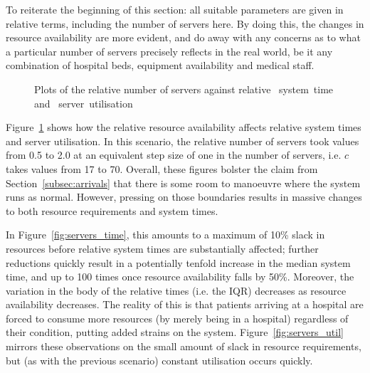 \documentclass[]{interact}
\newlength{\imgwidth}
\theoremstyle{plain}%
\theoremstyle{definition}
\theoremstyle{remark}
\begin{document}
To reiterate the beginning of this section: all suitable parameters are given in
relative terms, including the number of servers here. By doing this, the changes
in resource availability are more evident, and do away with any concerns as to
what a particular number of servers precisely reflects in the real world, be it
any combination of hospital beds, equipment availability and medical staff.

\begin{figure}
    \centering

    \caption{%
        Plots of the relative number of servers against relative
        ~system~time and
        ~server~utilisation
    }\label{fig:servers}
\end{figure}

Figure~\ref{fig:servers} shows how the relative resource availability affects
relative system times and server utilisation. In this scenario, the relative
number of servers took values from 0.5 to 2.0 at an equivalent step size of one
in the number of servers, i.e. \(c\) takes values from 17 to 70. Overall, these
figures bolster the claim from Section~\ref{subsec:arrivals} that there is some
room to manoeuvre where the system runs as normal. However, pressing on those
boundaries results in massive changes to both resource requirements and system
times.

In Figure~\ref{fig:servers_time}, this amounts to a maximum of 10\% slack in
resources before relative system times are substantially affected; further
reductions quickly result in a potentially tenfold increase in the median system
time, and up to 100 times once resource availability falls by 50\%. Moreover,
the variation in the body of the relative times (i.e. the IQR) decreases as
resource availability decreases. The reality of this is that patients arriving
at a hospital are forced to consume more resources (by merely being in a
hospital) regardless of their condition, putting added strains on the system.
Figure~\ref{fig:servers_util} mirrors these observations on the small amount of
slack in resource requirements, but (as with the previous scenario) constant
utilisation occurs quickly.
\end{document}
